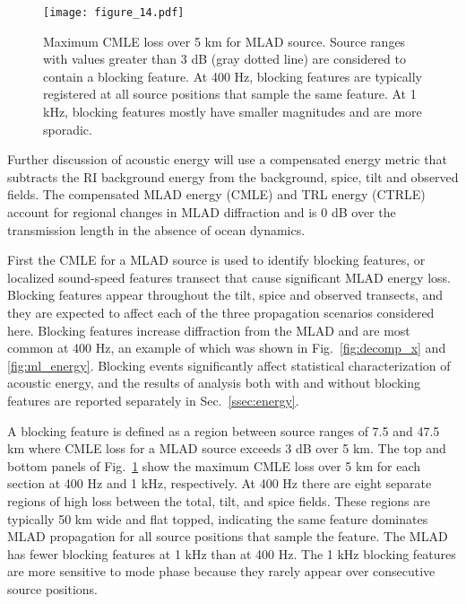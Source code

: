 \documentclass[preprint,NumberedRefs]{JASA}
\begin{document}
\begin{figure}
\texttt{[image: figure\_14.pdf]}
    \caption{Maximum CMLE loss over 5 km for MLAD source. Source ranges with values greater than 3 dB (gray dotted line) are considered to contain a blocking feature. At 400 Hz, blocking features are typically registered at all source positions that sample the same feature. At 1 kHz, blocking features mostly have smaller magnitudes and are more sporadic.}
    \label{fig:blocking}
\end{figure}
Further discussion of acoustic energy will use a compensated energy metric that subtracts the RI background energy from the background, spice, tilt and observed fields. The compensated MLAD energy (CMLE) and TRL energy (CTRLE) account for regional changes in MLAD diffraction and is 0 dB over the transmission length in the absence of ocean dynamics.

First the CMLE for a MLAD source is used to identify blocking features, or localized sound-speed features transect that cause significant MLAD energy loss. Blocking features appear throughout the tilt, spice and observed transects, and they are expected to affect each of the three propagation scenarios considered here. Blocking features increase diffraction from the MLAD and are most common at 400 Hz, an example of which was shown in Fig.~\ref{fig:decomp_x} and \ref{fig:ml_energy}. Blocking events significantly affect statistical characterization of acoustic energy, and the results of analysis both with and without blocking features are reported separately in Sec.~\ref{ssec:energy}.

A blocking feature is defined as a region between source ranges of 7.5 and 47.5 km where CMLE loss for a MLAD source exceeds 3 dB over 5 km. The top and bottom panels of Fig.~\ref{fig:blocking} show the maximum CMLE loss over 5 km for each section at 400 Hz and 1 kHz, respectively. At 400 Hz there are eight separate regions of high loss between the total, tilt, and spice fields. These regions are typically 50 km wide and flat topped, indicating the same feature dominates MLAD propagation for all source positions that sample the feature. The MLAD has fewer blocking features at 1 kHz than at 400 Hz. The 1 kHz blocking features are more sensitive to mode phase because they rarely appear over consecutive source positions.
\end{document}
